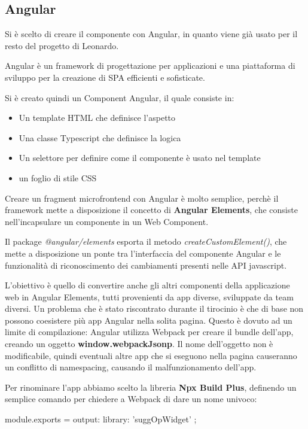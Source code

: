 \pagebreak
\subsection{Angular}
Si è scelto di creare il componente con Angular, in quanto viene già usato per il resto del progetto di Leonardo.

Angular è un framework di progettazione per applicazioni e una piattaforma di sviluppo per la creazione 
di SPA efficienti e sofisticate. \cite{angular}

Si è creato quindi un Component Angular, il quale consiste in:
\begin{itemize}
    \item Un template HTML che definisce l'aspetto
    \item Una classe Typescript che definisce la logica
    \item Un selettore per definire come il componente è usato nel template
    \item un foglio di stile CSS
\end{itemize}

Creare un fragment microfrontend con Angular è molto semplice, perchè il framework mette a disposizione il concetto di 
\textbf{Angular Elements}, che consiste nell'incapsulare un componente in un Web Component.

Il package \emph{@angular/elements} esporta il metodo \emph{createCustomElement()}, che mette a disposizione un ponte tra
l'interfaccia del componente Angular e le funzionalità di riconoscimento dei cambiamenti presenti nelle API javascript.

L'obiettivo è quello di convertire anche gli altri componenti della applicazione web in Angular Elements, tutti provenienti da app diverse,
sviluppate da team diversi.
Un problema che è stato riscontrato durante il tirocinio è che di base non possono coesistere più app Angular nella solita pagina.
Questo è dovuto ad un limite di compilazione: Angular utilizza Webpack per creare il bundle dell'app, creando un oggetto \textbf{window.webpackJsonp}.
Il nome dell'oggetto non è modificabile, quindi eventuali altre app che si eseguono nella pagina causeranno un conflitto di namespacing, causando
il malfunzionamento dell'app. \cite{webpackModifica}

Per rinominare l'app abbiamo scelto la libreria \textbf{Npx Build Plus}, definendo un semplice comando per chiedere a Webpack di 
dare un nome univoco:

module.exports = {
    output: {
        library: 'suggOpWidget'
    }
};


